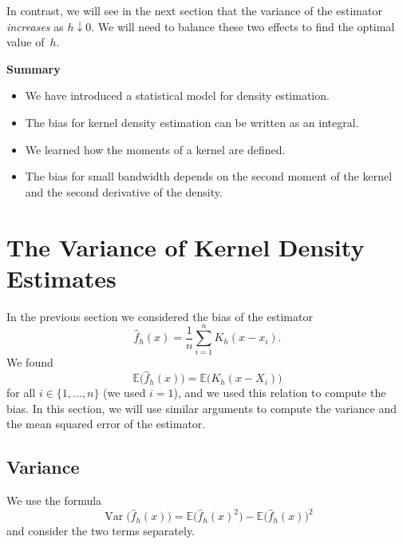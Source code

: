 \documentclass[
  a4paper,
]{article}
\providecommand{\tightlist}{%
  \setlength{\itemsep}{0pt}\setlength{\parskip}{0pt}}
\theoremstyle{definition}
\theoremstyle{definition}
\theoremstyle{definition}
\theoremstyle{definition}
\theoremstyle{remark}
\begin{document}
In contrast, we will see in the next section that the variance of the
estimator \emph{increases} as \(h \downarrow 0\). We will need to balance these
two effects to find the optimal value of~\(h\).

\textbf{Summary}

\begin{itemize}
\tightlist
\item
  We have introduced a statistical model for density estimation.
\item
  The bias for kernel density estimation can be written as an integral.
\item
  We learned how the moments of a kernel are defined.
\item
  The bias for small bandwidth depends on the second moment of the
  kernel and the second derivative of the density.
\end{itemize}

\clearpage

\hypertarget{X03-Var}{%
\section{The Variance of Kernel Density Estimates}\label{X03-Var}}

In the previous section we considered the bias of the estimator
\begin{equation*}
  \hat f_h(x)
  = \frac{1}{n} \sum_{i=1}^n K_h(x - x_i).
\end{equation*}
We found
\begin{equation}
  \mathbb{E}\bigl( \hat f_h(x) \bigr)
  = \mathbb{E}\bigl( K_h(x - X_i) \bigr)  \label{eq:E-hat-f-K-h}
\end{equation}
for all \(i \in \{1, \ldots, n\}\) (we used \(i=1\)), and we used this relation
to compute the bias. In this section, we will use similar arguments to compute
the variance and the mean squared error of the estimator.

\hypertarget{variance}{%
\subsection{Variance}\label{variance}}

We use the formula
\begin{equation*}
  \mathop{\mathrm{Var}}\bigl( \hat f_h(x) \bigr)
  = \mathbb{E}\bigl( \hat f_h(x)^2 \bigr) - \mathbb{E}\bigl( \hat f_h(x) \bigr)^2
\end{equation*}
and consider the two terms separately.
\end{document}
